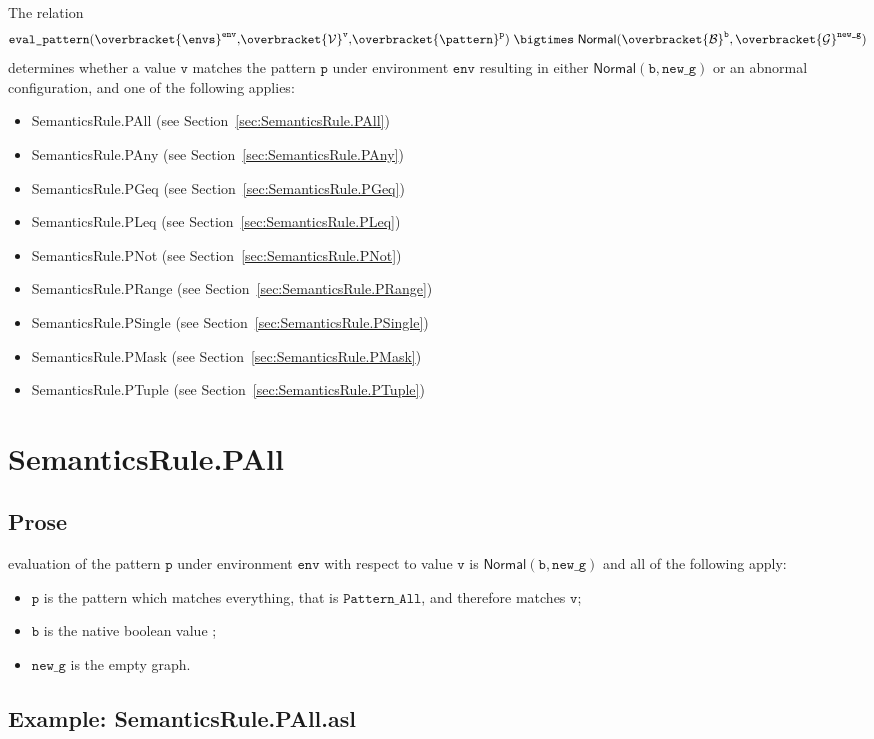 \documentclass{book}
\newcommand\secref[1]{Section~\ref{sec:#1}}
\newcommand\overname[2]{\overbracket{#1}^{#2}}
\newcommand\XGraphs[0]{\mathcal{G}}
\newcommand\vals[0]{\mathcal{V}}
\newcommand\tbool[0]{\mathcal{B}}
\newcommand\aslrel[0]{\bigtimes}
\newcommand\aslsep[0]{\mathbf{,}}
\newcommand\evalpattern[1]{\texttt{eval\_pattern}(#1)}
\newcommand\Normal[0]{\textsf{Normal}}
\newcommand\env[0]{\texttt{env}}
\newcommand\newg[0]{\texttt{new\_g}}
\newcommand\vp[0]{\texttt{p}}
\newcommand\vv[0]{\texttt{v}}
\newcommand\vb[0]{\texttt{b}}
\begin{document}
The relation
\[
  \evalpattern{\overname{\envs}{\env} \aslsep \overname{\vals}{\vv} \aslsep \overname{\pattern}{\vp}} \;\aslrel\;
  \Normal(\overname{\tbool}{\vb}, \overname{\XGraphs}{\newg})
\]
determines whether a value $\vv$ matches the pattern $\vp$ under environment $\env$
resulting in either $\Normal(\vb, \newg)$ or an abnormal configuration,
and one of the following applies:
\begin{itemize}
\item SemanticsRule.PAll (see \secref{SemanticsRule.PAll})
\item SemanticsRule.PAny (see \secref{SemanticsRule.PAny})
\item SemanticsRule.PGeq (see \secref{SemanticsRule.PGeq})
\item SemanticsRule.PLeq (see \secref{SemanticsRule.PLeq})
\item SemanticsRule.PNot (see \secref{SemanticsRule.PNot})
\item SemanticsRule.PRange (see \secref{SemanticsRule.PRange})
\item SemanticsRule.PSingle (see \secref{SemanticsRule.PSingle})
\item SemanticsRule.PMask (see \secref{SemanticsRule.PMask})
\item SemanticsRule.PTuple (see \secref{SemanticsRule.PTuple})
\end{itemize}

\section{SemanticsRule.PAll \label{sec:SemanticsRule.PAll}}
  \subsection{Prose}
  evaluation of the pattern $\vp$ under environment $\env$ with
  respect to value $\vv$ is $\Normal(\vb, \newg)$ and all of the following apply:
  \begin{itemize}
    \item $\vp$ is the pattern which matches everything, that is $\texttt{Pattern\_All}$, and therefore
      matches $\vv$;
    \item $\vb$ is the native boolean value \True;
    \item $\newg$ is the empty graph.
  \end{itemize}

  \subsection{Example: SemanticsRule.PAll.asl}
\end{document}
